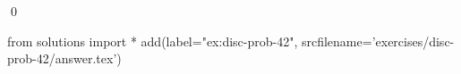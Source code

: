 
\begin{ex} 
  \label{ex:disc-prob-42}
  
  \qed
\end{ex} 
\begin{python0}
from solutions import *
add(label="ex:disc-prob-42",
    srcfilename='exercises/disc-prob-42/answer.tex') 
\end{python0}
